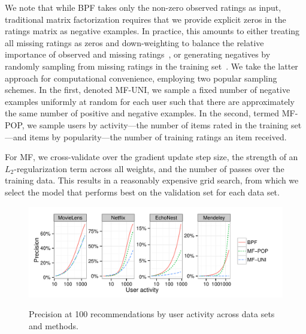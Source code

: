 We note that while BPF takes only the non-zero observed ratings as
input, traditional matrix factorization requires that we provide
explicit zeros in the ratings matrix as negative examples. In
practice, this amounts to either treating all missing ratings as zeros
and down-weighting to balance the relative importance of observed and
missing ratings~\cite{Hu:2008p9402}, or generating negatives by
randomly sampling from missing ratings in the training
set~\cite{Dror:2012a}.  We take the latter approach for computational
convenience, employing two popular sampling schemes. In the first,
denoted MF-UNI, we sample a fixed number of negative examples
uniformly at random for each user such that there are approximately
the same number of positive and negative examples. In the second,
termed MF-POP, we sample users by activity---the number of items rated
in the training set---and items by popularity---the number of training
ratings an item received. 

For MF, we cross-validate over the gradient update step size, the
strength of an $L_2$-regularization term across all weights, and the
number of passes over the training data. This results in a reasonably
expensive grid search, from which we select
the model that performs best on the validation set for each data set.

\begin{figure}[t]
\centering
\includegraphics[width=\textwidth]{./figures/precision_by_user_activity_and_method.pdf}\\
\label{fig:precision_by_user_activity}
\caption{Precision at 100 recommendations by user activity across data sets and methods.}
\end{figure}


